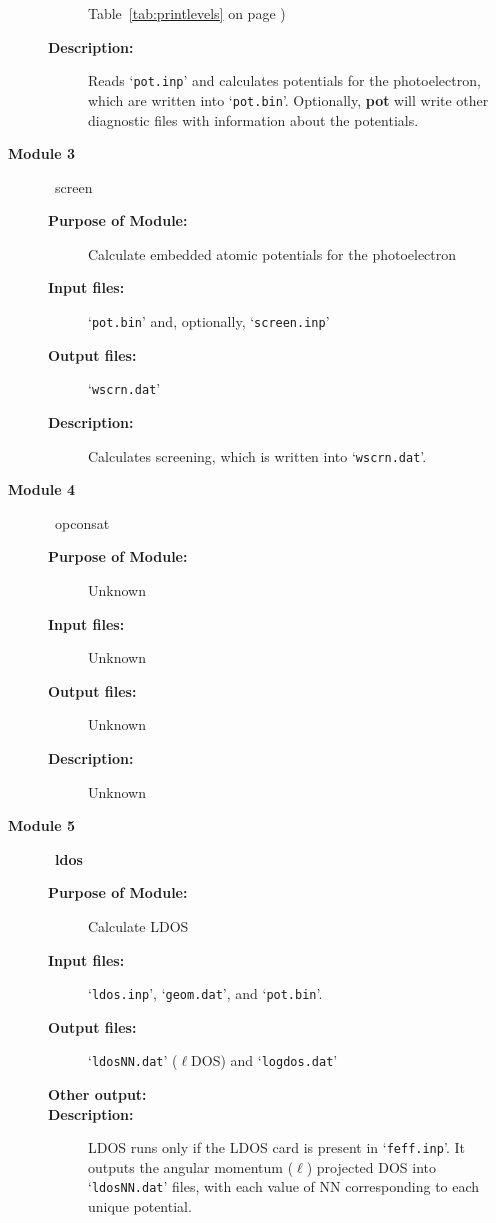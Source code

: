 \documentclass[11pt,oneside]{report} %
\newcommand{\file}[1]{`\texttt{#1}'}
\newcommand{\module}[1]{\textrm{\bf{#1}}}
\begin{document}
\begin{latexonly}
\begin{description}
\begin{description}
    Table~\ref{tab:printlevels} on page \pageref{tab:printlevels})
  \item[\textbf{Description:}] Reads \file{pot.inp} and calculates potentials
    for the photoelectron, which are written into \file{pot.bin}.
    Optionally, \module{pot} will write other diagnostic files with information
    about the potentials.
  \end{description}
\item [\large\textbf{Module 3}]\dotfill\  {\large\textrm{screen}}
  \begin{description}
  \item[\textbf{Purpose of Module:}] Calculate embedded atomic
    potentials for the photoelectron
  \item[\textbf{Input files:}] \file{pot.bin} and, optionally, \file{screen.inp}
  \item[\textbf{Output files:}] \file{wscrn.dat}
  \item[\textbf{Description:}] Calculates screening, which is written into \file{wscrn.dat}.
  \end{description}
\item [\large\textbf{Module 4}]\dotfill\  {\large\textrm{opconsat}}
  \begin{description}
  \item[\textbf{Purpose of Module:}] Unknown
  \item[\textbf{Input files:}] Unknown
  \item[\textbf{Output files:}] Unknown
  \item[\textbf{Description:}] Unknown
  \end{description}
\item[\large\textbf{Module 5}]\dotfill\  {\large\module{ldos}}
  \begin{description}
  \item[\textbf{Purpose of Module:}] Calculate LDOS
  \item[\textbf{Input files:}] \file{ldos.inp}, \file{geom.dat}, 
    and \file{pot.bin}.
  \item[\textbf{Output files:}] \file{ldosNN.dat} ($\ell$DOS) and 
    \file{logdos.dat}
  \item[\textbf{Other output:}] 
  \item[\textbf{Description:}] LDOS runs only if the LDOS card is 
    present in \file{feff.inp}. It outputs the angular momentum ($\ell$) projected DOS 
    into \file{ldosNN.dat} files, with each value of NN corresponding 
    to each unique potential.

\end{description}
\end{description}
\end{latexonly}
\end{document}
